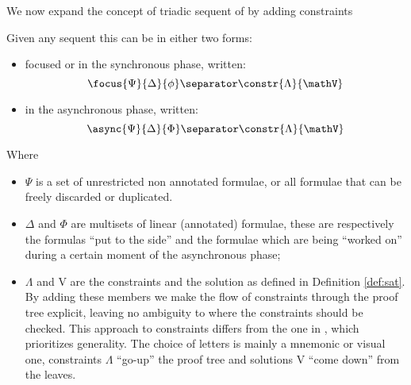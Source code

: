 We now expand the concept of triadic sequent of \cite{Focusing} by adding constraints
\begin{define}
	Given any sequent this can be in either two forms:
	\begin{itemize}
		\item focused or in the synchronous phase, written:
			$$\focus{\Psi}{\Delta}{\phi} \separator \constr{\Lambda}{\mathV}$$
		\item in the asynchronous phase, written:
			$$\async{\Psi}{\Delta}{\Phi} \separator \constr{\Lambda}{\mathV}$$
	\end{itemize}
	Where 
	\begin{itemize}
		\item $\Psi$ is a set of unrestricted non annotated formulae, or all formulae that can be freely discarded or duplicated.
		\item $\Delta$ and $\Phi$ are multisets of linear (annotated) formulae, these are respectively the formulas ``put to the side'' and the formulae which are being ``worked on'' during a certain moment of the asynchronous phase;
		\item $\Lambda$ and V are the constraints and the solution as defined in Definition \ref{def:sat}.
			By adding these members we make the flow of constraints through the proof tree explicit, leaving no ambiguity to where the constraints should be checked.
			This approach to constraints differs from the one in \cite{HarlandPym}, which prioritizes generality.
			The choice of letters is mainly a mnemonic or visual one, constraints $\Lambda$ ``go-up'' the proof tree and solutions V ``come down'' from the leaves.
	\end{itemize}
\end{define}

